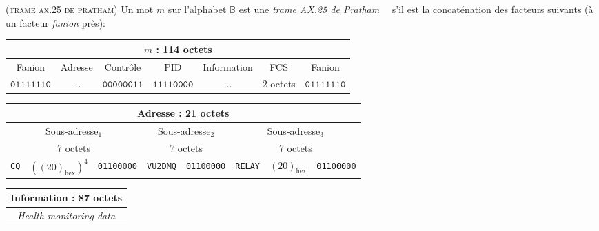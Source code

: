 \documentclass[twocolumn,pre,floats,aps,amsmath,amssymb]{revtex4}
\newenvironment{definition}[1][D\'efinition.]{\begin{trivlist}
\item[\hskip \labelsep {\bfseries #1}]}{\end{trivlist}}
\begin{document}
\begin{definition}
  \textsc{(trame ax.25 de pratham)}
  Un mot $m$ sur l'alphabet $\mathbb{B}$ est une \textit{trame AX.25 de Pratham}~\cite{IITB}~\cite{ax25} s'il est la concat\'enation des facteurs suivants (\`a un facteur \textit{fanion} pr\`es):
  \begin{footnotesize}
    \begin{tabular}{|c|c|c|c|c|c|c|}
      \hline
      \multicolumn{7}{|c|}{$m$ : 114 octets}\\
      \hline
      Fanion & Adresse & Contr\^ole & PID & {\tiny Information} & FCS & Fanion\\
      \hline
      $\texttt{01111110}$ & $\dots$ & $\texttt{00000011}$ & $\texttt{11110000}$ & $\dots$ & $2$ octets & $\texttt{01111110}$\\
      \hline
    \end{tabular}
  \end{footnotesize}
\begin{center}
  \begin{footnotesize}
    \begin{tabular}{|c|c|c|c|c|c|c|c|}
      \hline
      \multicolumn{8}{|c|}{Adresse : 21 octets}\\
      \hline
      \multicolumn{3}{|c|}{Sous-adresse$_1$} & \multicolumn{2}{c|}{Sous-adresse$_2$} & \multicolumn{3}{c|}{Sous-adresse$_3$}\\
      \hline
      \multicolumn{3}{|c|}{7 octets} & \multicolumn{2}{c|}{7 octets} & \multicolumn{3}{c|}{7 octets}\\
      \hline
      \texttt{CQ} & $\left ( (20)_{\operatorname{hex}} \right )^4$ & \texttt{01100000} & \texttt{VU2DMQ} & \texttt{01100000} & \texttt{RELAY} & $(20)_{\operatorname{hex}}$ & \texttt{01100000}\\
      \hline
    \end{tabular}
  \end{footnotesize}
\end{center}

\begin{center}
  \begin{footnotesize}
    \begin{tabular}{|c|}
      \hline
      Information : 87 octets\\
      \hline
      \textit{Health monitoring data}\cite{IITB}\\
      \hline
    \end{tabular}
  \end{footnotesize}
\end{center}

\end{definition}
\end{document}
